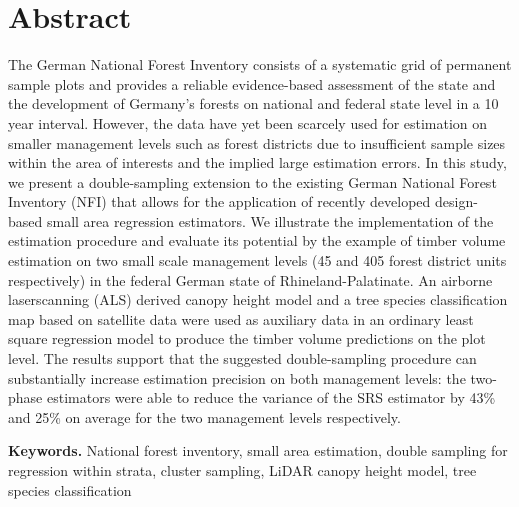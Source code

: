
\section*{Abstract} 
\label{sec:abstract}
The German National Forest Inventory consists of a systematic grid of permanent sample plots and provides a reliable evidence-based assessment of the state and the development of Germany's forests on national and federal state level in a 10 year interval. However, the data have yet been scarcely used for estimation on smaller management levels such as forest districts due to insufficient sample sizes within the area of interests and the implied large estimation errors. In this study, we present a double-sampling extension to the existing German National Forest Inventory (NFI) that allows for the application of recently developed design-based small area regression estimators. We illustrate the implementation of the estimation procedure and evaluate its potential by the example of timber volume estimation on two small scale management levels (45 and 405 forest district units respectively) in the federal German state of Rhineland-Palatinate. An airborne laserscanning (ALS) derived canopy height model and a tree species classification map based on satellite data were used as auxiliary data in an ordinary least square regression model to produce the timber volume predictions on the plot level.
The results support that the suggested double-sampling procedure can substantially increase estimation precision on both management levels: the two-phase estimators were able to reduce the variance of the SRS estimator by 43\% and 25\% on average for the two management levels respectively.


\vspace{0.2cm} \noindent \textbf{Keywords.} National forest inventory, small area estimation, double sampling for regression within strata, cluster sampling, LiDAR canopy height model, tree species classification \vspace{-1cm}

